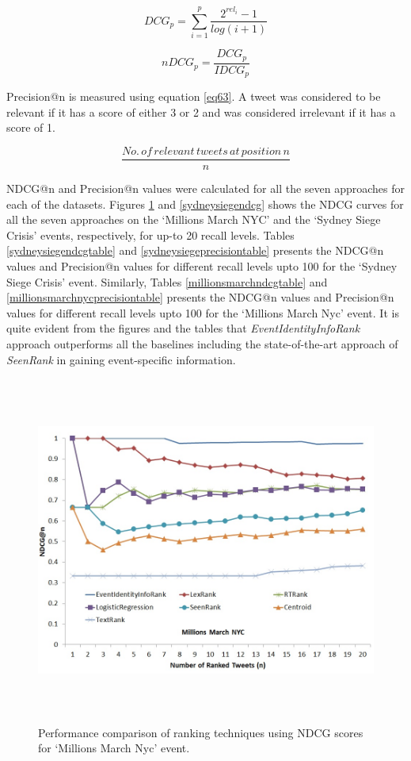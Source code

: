 \begin{equation}
\label{eq61}
DCG_{p} = \sum_{i=1}^{p}\frac{2^{rel_{i}}-1}{log(i+1)}
\end{equation}

\begin{equation}
\label{eq62}
nDCG_{p} = \frac{DCG_{p}}{IDCG_{p}} 
\end{equation}

Precision@n is measured using equation \ref{eq63}. A tweet was considered to be relevant if it has a score of either 3 or 2 and was considered irrelevant if it has a score of 1.

\begin{equation}
\label{eq63}
\frac{No.\,of\, relevant\, tweets\, at\, position\, n}{n}
\end{equation}

NDCG@n and Precision@n values were calculated for all the seven approaches for each of the datasets. Figures \ref{millionsmarchndcg} and \ref{sydneysiegendcg} shows the NDCG curves for all the seven approaches on the `Millions March NYC' and the `Sydney Siege Crisis' events, respectively, for up-to 20 recall levels. Tables \ref{sydneysiegendcgtable} and \ref{sydneysiegeprecisiontable} presents the NDCG@n values and Precision@n values for different recall levels upto 100 for the `Sydney Siege Crisis' event. Similarly, Tables \ref{millionsmarchndcgtable} and \ref{millionsmarchnycprecisiontable} presents the NDCG@n values and Precision@n values for different recall levels upto 100 for the `Millions March Nyc' event. It is quite evident from the figures and the tables that \textit{EventIdentityInfoRank} approach outperforms all the baselines including the state-of-the-art approach of \textit{SeenRank} in gaining event-specific information.



\begin{figure}[htbp]
\centering
\includegraphics[height=4.5in,width=6in]{Figures/EventIdentityInfoRankPerformanceMillionsMarchNyc.jpg}
\caption{Performance comparison of ranking techniques using NDCG scores for `Millions March Nyc' event.}
\label{millionsmarchndcg}
\end{figure}

